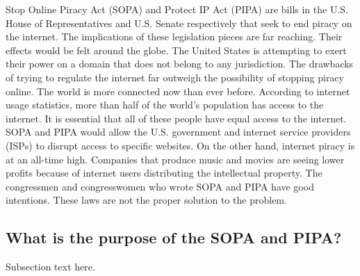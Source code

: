 \documentclass[11pt,journal,compsoc]{IEEEtran}
\begin{document}
\IEEEdisplaynontitleabstractindextext

\IEEEpeerreviewmaketitle




 Stop Online Piracy Act (SOPA) and Protect IP Act (PIPA) are bills in the U.S. House of Representatives and U.S. Senate respectively that seek to end piracy on the internet. The implications of these legislation pieces are far reaching. Their effects would be felt around the globe. The United States is attempting to exert their power on a domain that does not belong to any jurisdiction. The drawbacks of trying to regulate the internet far outweigh the possibility of stopping piracy online. The world is more connected now than ever before. According to internet usage statistics, more than half of the world's population has access to the internet. It is essential that all of these people have equal access to the internet. SOPA and PIPA would allow the U.S. government and internet service providers (ISPs) to disrupt access to specific websites. On the other hand, internet piracy is at an all-time high. Companies that produce music and movies are seeing lower profits because of internet users distributing the intellectual property. The congressmen and congresswomen who wrote SOPA and PIPA have good intentions. These laws are not the proper solution to the problem.


\subsection{What is the purpose of the SOPA and PIPA?}
Subsection text here.
\end{document}
